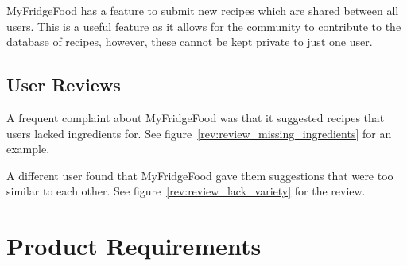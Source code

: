 MyFridgeFood has a feature to submit new recipes which are shared between all users. This is a useful feature as it allows for the community to contribute to the database
of recipes, however, these cannot be kept private to just one user.

\subsection{User Reviews}

A frequent complaint about MyFridgeFood was that it suggested
recipes that users lacked ingredients for. See figure~\ref{rev:review_missing_ingredients} for an example.

A different user found that MyFridgeFood gave them suggestions that were too similar to each
other. See figure~\ref{rev:review_lack_variety} for the review.

\section{Product Requirements}

\newcommand{\requirementtype}{FR}
\newcommand{\requirement}[4]{%
    \requirementtype\stepcounter{functionalreqcounter}\arabic{functionalreqcounter}%
    &\raggedright#1&#2&#3&#4\\}

